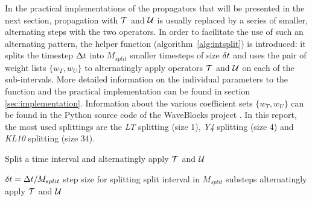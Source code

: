 %
In the practical implementations of the propagators that will be presented in the next section, propagation with $\mathcal{T}$ and $\mathcal{U}$ is usually replaced by a series of smaller, alternating steps with the two operators.
In order to facilitate the use of such an alternating pattern, the helper function  (algorithm~\ref{alg:intsplit}) is introduced:
it splits the timestep $\Delta t$ into $M_{split}$ smaller timesteps of size $\delta t$ and uses the pair of weight lists $\{ w_T, w_U \}$ to alternatingly apply operators $\mathcal{T}$ and $\mathcal{U}$ on each of the sub-intervals.
More detailed information on the individual parameters to the  function and the practical implementation can be found in section \ref{sec:implementation}.
Information about the various coefficient sets $\{w_T, w_U\}$ can be found in the Python source code of the WaveBlocks project \cite{libwaveblocks}.
In this report, the most used splittings are the \emph{LT} splitting (size 1), \emph{Y4} splitting (size 4) and \emph{KL10} splitting (size 34).
%
\begin{algorithm}[ht]
	\caption{Split a time interval and alternatingly apply $\mathcal{T}$ and $\mathcal{U}$}
	\label{alg:intsplit}
	\begin{algorithmic}
		\State
			\State
			\State $\delta t = \Delta t/M_{split}$
			\Comment step size for splitting
			\Comment split interval in $M_{split}$ substeps
				\Comment alternatingly apply $\mathcal{T}$ and $\mathcal{U}$
					\State {}
					\State {}
				\EndFor
			\EndFor
		\State
		\EndProcedure
	\end{algorithmic}
\end{algorithm}



